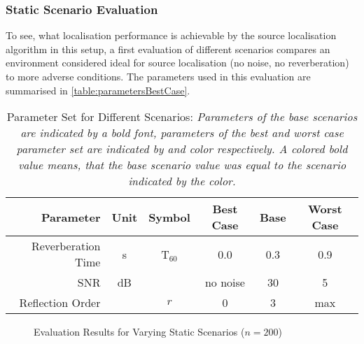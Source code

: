\subsubsection{Static Scenario Evaluation}
\label{sec:ScenarioEvalStatic}

To see, what localisation performance is achievable by the source localisation algorithm in this setup, a first evaluation of different scenarios compares an environment considered ideal for source localisation (no noise, no reverberation) to more adverse conditions. The parameters used in this evaluation are summarised in \autoref{table:parametersBestCase}.

\begin{table}[!hbt]
	\begin{tabular}{rccccc}
		\toprule
		Parameter          & Unit & Symbol   & Best Case & Base     & Worst Case \\
		\midrule
		Reverberation Time & s    & T$_{60}$ & 0.0       & 0.3      & 0.9        \\
		SNR                & dB   &          & no noise  & 30       & 5          \\
		Reflection Order   &      & $r$      & 0         & 3        & max        \\
		\bottomrule
	\end{tabular}
	\caption[Parameter Set for Different Scenarios]{Parameter Set for Different Scenarios: \itshape Parameters of the base scenarios are indicated by a bold font, parameters of the best and worst case parameter set are indicated by  and  color respectively. A colored bold value means, that the base scenario value was equal to the scenario indicated by the color.}
	\label{table:parametersBestCase}
\end{table}

\begin{figure}[H]
	\iftoggle{quick}{%
		\texttt{[image: plots/boxplots/boxplot-joined-best-case]}
	}{%
		
	}
	\caption[Evaluation Results for Varying Static Scenarios]{Evaluation Results for Varying Static Scenarios ($n=200$)}
	\label{fig:trialCases}
\end{figure}


